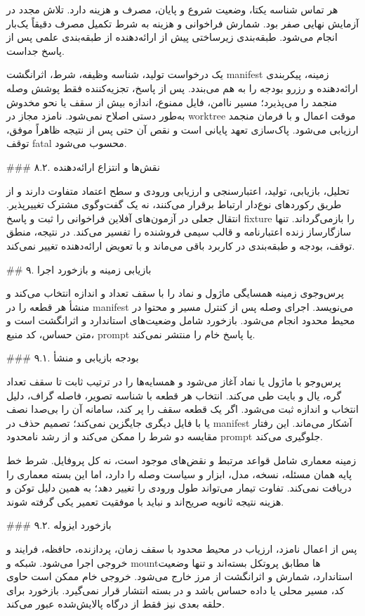 \documentclass[11pt,a4paper]{article}
\begin{document}
هر تماس شناسه یکتا، وضعیت شروع و پایان، مصرف و هزینه دارد. تلاش مجدد در آزمایش نهایی صفر بود. شمارش
فراخوانی و هزینه به شرط تکمیل مصرف دقیقاً یک‌بار انجام می‌شود. طبقه‌بندی زیرساختی پیش از ارائه‌دهنده
از طبقه‌بندی علمی پس از پاسخ جداست.

یک درخواست تولید، شناسه وظیفه، شرط، اثرانگشت manifest زمینه، پیکربندی ارائه‌دهنده و رزرو بودجه را
به هم می‌بندد. پس از پاسخ، تجزیه‌کننده فقط پوشش وصله منجمد را می‌پذیرد؛ مسیر ناامن، فایل ممنوع، اندازه
بیش از سقف یا نحو مخدوش به‌طور دستی اصلاح نمی‌شود. نامزد مجاز در worktree موقت اعمال و با فرمان منجمد
ارزیابی می‌شود. پاک‌سازی تعهد پایانی است و نقص آن حتی پس از نتیجه ظاهراً موفق، توقف fatal محسوب می‌شود.

\#\#\# ۸.۲. نقش‌ها و انتزاع ارائه‌دهنده

تحلیل، بازیابی، تولید، اعتبارسنجی و ارزیابی ورودی و سطح اعتماد متفاوت دارند و از طریق رکوردهای نوع‌دار
ارتباط برقرار می‌کنند، نه یک گفت‌وگوی مشترک تغییرپذیر. انتقال جعلی در آزمون‌های آفلاین فراخوانی را ثبت
و پاسخ fixture را بازمی‌گرداند. تنها سازگارساز زنده اعتبارنامه و قالب سیمی فروشنده را تفسیر می‌کند.
در نتیجه، منطق توقف، بودجه و طبقه‌بندی در کاربرد باقی می‌ماند و با تعویض ارائه‌دهنده تغییر نمی‌کند.

\#\# ۹. بازیابی زمینه و بازخورد اجرا

پرس‌وجوی زمینه همسایگی ماژول و نماد را با سقف تعداد و اندازه انتخاب می‌کند و منشأ هر قطعه را در manifest
می‌نویسد. اجرای وصله پس از کنترل مسیر و محتوا در محیط محدود انجام می‌شود. بازخورد شامل وضعیت‌های
استاندارد و اثرانگشت است و متن حساس، کد منبع، prompt یا پاسخ خام را منتشر نمی‌کند.

\#\#\# ۹.۱. بودجه بازیابی و منشأ

پرس‌وجو با ماژول یا نماد آغاز می‌شود و همسایه‌ها را در ترتیب ثابت تا سقف تعداد گره، یال و بایت طی
می‌کند. انتخاب هر قطعه با شناسه تصویر، فاصله گراف، دلیل انتخاب و اندازه ثبت می‌شود. اگر یک قطعه سقف را
پر کند، سامانه آن را بی‌صدا نصف یا با فایل دیگری جایگزین نمی‌کند؛ تصمیم حذف در manifest آشکار می‌ماند.
این رفتار مقایسه دو شرط را ممکن می‌کند و از رشد نامحدود prompt جلوگیری می‌کند.

زمینه معماری شامل قواعد مرتبط و نقض‌های موجود است، نه کل پروفایل. شرط خط پایه همان مسئله، نسخه، مدل،
ابزار و سیاست وصله را دارد، اما این بسته معماری را دریافت نمی‌کند. تفاوت تیمار می‌تواند طول ورودی را
تغییر دهد؛ به همین دلیل توکن و هزینه نتیجه ثانویه صریح‌اند و نباید با موفقیت تعمیر یکی گرفته شوند.

\#\#\# ۹.۲. بازخورد ایزوله

پس از اعمال نامزد، ارزیاب در محیط محدود با سقف زمان، پردازنده، حافظه، فرایند و خروجی اجرا می‌شود.
شبکه و mountها مطابق پروتکل بسته‌اند و تنها وضعیت استاندارد، شمارش و اثرانگشت از مرز خارج می‌شود.
خروجی خام ممکن است حاوی کد، مسیر محلی یا داده حساس باشد و در بسته انتشار قرار نمی‌گیرد. بازخورد برای
حلقه بعدی نیز فقط از درگاه پالایش‌شده عبور می‌کند.
\end{document}
